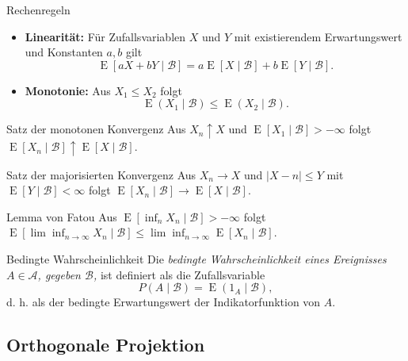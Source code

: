 \begin{defi}{Rechenregeln}
\begin{itemize}
\[              \]
        \item \textbf{Linearität:} Für Zufallsvariablen $X$ und $Y$ mit existierendem Erwartungswert und Konstanten $a, b$ gilt
              \[
                  \operatorname{E} [aX + bY \mid \mathcal{B}] = a \operatorname{E} [X \mid \mathcal{B}] + b \operatorname{E} [Y \mid \mathcal{B}].
              \]
        \item \textbf{Monotonie:} Aus $X_{1}\leq X_{2}$ folgt
              \[
                  \operatorname{E} (X_{1}\mid{\mathcal{B}})\leq \operatorname{E} (X_{2}\mid{\mathcal{B}}).
              \]
    \end{itemize}
\end{defi}

\begin{theo}{Satz der monotonen Konvergenz}
    Aus $X_n \uparrow X$ und $\operatorname{E} [X_1 \mid \mathcal{B}] > - \infty$ folgt $\operatorname{E} [X_n \mid \mathcal{B}] \uparrow \operatorname{E} [X \mid \mathcal{B}]$.
\end{theo}

\begin{theo}{Satz der majorisierten Konvergenz}
    Aus $X_n \to X$ und $\mid X-n\mid \leq Y$ mit $\operatorname{E} [Y \mid \mathcal{B}] < \infty$ folgt $\operatorname{E} [X_n \mid \mathcal{B}] \to \operatorname{E} [X \mid \mathcal{B}]$.
\end{theo}

\begin{theo}{Lemma von Fatou}
    Aus $\operatorname{E} [\inf_n X_n \mid \mathcal{B}] > - \infty$ folgt $\operatorname{E} [\lim\inf_{n\to\infty} X_n \mid \mathcal{B}] \leq \lim\inf_{n\to\infty} \operatorname{E} [X_n \mid \mathcal{B}]$.
\end{theo}

\begin{defi}{Bedingte Wahrscheinlichkeit}
    Die \emph{bedingte Wahrscheinlichkeit eines Ereignisses $A\in{\mathcal{A}}$, gegeben $\mathcal{B}$,} ist definiert als die Zufallsvariable
    \[
        P(A\mid{\mathcal{B}}) = \operatorname{E} (\mathrm{1}_{A}\mid{\mathcal{B}}),
    \]
    d. h. als der bedingte Erwartungswert der Indikatorfunktion von $A$.
\end{defi}

\subsection{Orthogonale Projektion}

